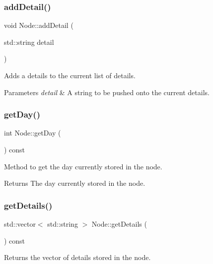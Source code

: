 \subsubsection{\texorpdfstring{add\+Detail()}{addDetail()}}
{\footnotesize\ttfamily void Node\+::add\+Detail (\begin{DoxyParamCaption}\item[{std\+::string}]{detail }\end{DoxyParamCaption})}



Adds a details to the current list of details. 


\begin{DoxyParams}{Parameters}
{\em detail} & A string to be pushed onto the current details. \\
\hline
\end{DoxyParams}
\hypertarget{class_node_a73aa0f295caeb4106319ebb8d6c9f9d8}{}\label{class_node_a73aa0f295caeb4106319ebb8d6c9f9d8} 
\subsubsection{\texorpdfstring{get\+Day()}{getDay()}}
{\footnotesize\ttfamily int Node\+::get\+Day (\begin{DoxyParamCaption}{ }\end{DoxyParamCaption}) const}



Method to get the day currently stored in the node. 

\begin{DoxyReturn}{Returns}
The day currently stored in the node. 
\end{DoxyReturn}
\hypertarget{class_node_a264e8357261b6cc1c1969493b2b956d4}{}\label{class_node_a264e8357261b6cc1c1969493b2b956d4} 
\subsubsection{\texorpdfstring{get\+Details()}{getDetails()}}
{\footnotesize\ttfamily std\+::vector$<$ std\+::string $>$ Node\+::get\+Details (\begin{DoxyParamCaption}{ }\end{DoxyParamCaption}) const}



Returns the vector of details stored in the node. 

